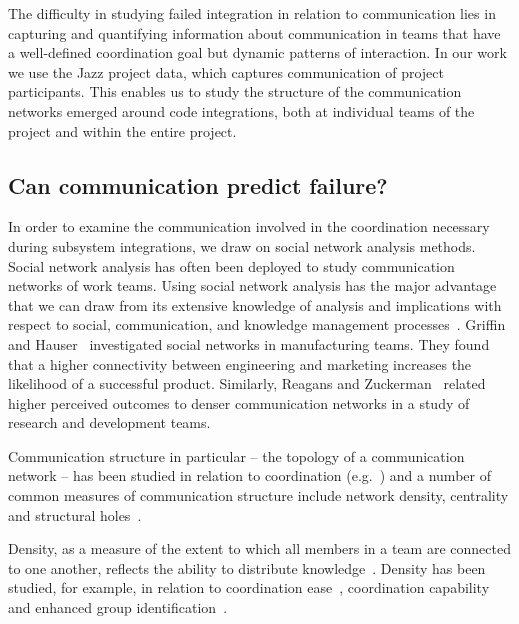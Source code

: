 The difficulty in studying failed integration in relation to communication lies
in capturing and quantifying information about communication in teams that have a
well-defined coordination goal but dynamic patterns of interaction. In our work
we use the Jazz project data, which captures communication of project
participants. This enables us to study the structure of the communication
networks emerged around code integrations, both at individual teams of the
project and within the entire project.

\subsection{Can communication predict failure?}
\label{sec:ResearchQuestions}
In order to examine the communication involved in the coordination necessary
during subsystem integrations, we draw on social network analysis methods. Social
network analysis has often been deployed to study communication networks of work
teams. Using social network analysis has the major advantage that we can draw
from its extensive knowledge of analysis and implications with respect to social,
communication, and knowledge management
processes~\cite{Burt:1995vo,Freeman:1979rl}. Griffin and
Hauser~\cite{Griffin:1992ms} investigated social networks in manufacturing teams.
They found that a higher connectivity between engineering and marketing increases
the likelihood of a successful product. Similarly, Reagans and
Zuckerman~\cite{RayReagans:2001os} related higher perceived outcomes to denser
communication networks in a study of research and development teams.

Communication structure in particular -- the topology of a communication network
-- has been studied in relation to coordination
(e.g.~\cite{hossain:cscw:2006,hinds:cscw:2006}) and a number of common measures of
communication structure include network density, centrality and structural
holes~\cite{Wasserman:1994sq,Freeman:1979rl}.

Density, as a measure of the extent to which all members in a team are
connected to one another, reflects the ability to distribute
knowledge~\cite{Rulke:2000ys}. Density has been studied, for example, in relation
to coordination ease~\cite{hinds:cscw:2006}, coordination
capability~\cite{hossain:cscw:2006} and enhanced group
identification~\cite{RayReagans:2001os}.


